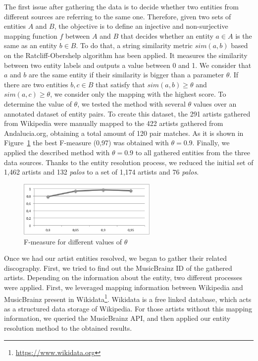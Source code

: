 The first issue after gathering the data is to decide whether two entities from different sources are referring to the same one. Therefore, given two sets of entities $A$ and $B$, the objective is to define an injective and non-surjective mapping function $f$ between $A$ and $B$ that decides whether an entity $a \in A$ is the same as an entity $b \in B$. To do that, a string similarity metric $sim(a,b)$ based on the Ratcliff-Obershelp algorithm \citep{Ratcliff1988} has been applied. It measures the similarity between two entity labels and outputs a value between 0 and 1. We consider that $a$ and $b$ are the same entity if their similarity is bigger than a parameter $\theta$. If there are two entities $b, c \in B$ that satisfy that $sim(a,b) \geq \theta$ and $sim(a,c) \geq \theta$, we consider only the mapping with the highest score. To determine the value of $\theta$, we tested the method with several $\theta$ values over an annotated dataset of entity pairs. To create this dataset, the 291 artists gathered from Wikipedia were manually mapped to the 422 artists gathered from Andalucia.org, obtaining a total amount of 120 pair matches. As it is shown in Figure~\ref{fig:musicology:fmeasure} the best F-measure (0,97) was obtained with $\theta=0.9$. Finally, we applied the described method with $\theta=0.9$ to all gathered entities from the three data sources. Thanks to the entity resolution process, we reduced the initial set of 1,462 artists and 132 \textit{palos} to a set of 1,174 artists and 76 \textit{palos}.

\begin{figure}
	\centering
	\includegraphics[width=0.60\textwidth]{ch05_musicology_pics/similarity_f_bn.png}
	\caption{F-measure for different values of $\theta$ \label{fig:musicology:fmeasure}}
\end{figure}

Once we had our artist entities resolved, we began to gather their related discography. First, we tried to find out the MusicBrainz ID of the gathered artists. Depending on the information about the entity, two different processes were applied. First, we leveraged mapping information between Wikipedia and MusicBrainz present in Wikidata\footnote{\url{https://www.wikidata.org}}. Wikidata is a free linked database, which acts as a structured data storage of Wikipedia. %
For those artists without this mapping information, we queried the MusicBrainz API, and then applied our entity resolution method to the obtained results.

